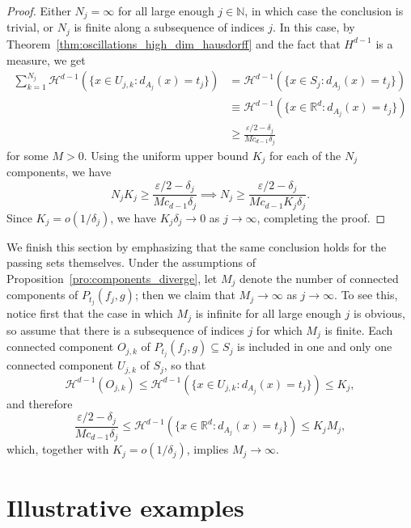 \documentclass[12pt]{article}
\newcommand{\RR}{\mathbb{R}}
\newcommand{\NN}{\mathbb{N}}
\begin{document}
\begin{proof}
Either $N_j=\infty$ for all large enough $j\in\NN$, in which case the conclusion is trivial, or
$N_j$ is finite along a subsequence of indices $j$. In this case, by
Theorem~\ref{thm:oscillations_high_dim_hausdorff} and the fact that $H^{d-1}$ is a measure, we get
\begin{align*}
\sum_{k=1}^{N_j} \mathcal{H}^{d-1}(\{x \in U_{j,k} : d_{A_j}(x) = t_j\}) & = \mathcal{H}^{d-1}(\{x \in S_j : d_{A_j}(x) = t_j\}) \\
& \equiv \mathcal{H}^{d-1}(\{x \in \RR^d : d_{A_j}(x) = t_j\}) \\
& \geq \frac{\varepsilon/2 - \delta_j}{M c_{d-1}\delta_j}
\end{align*}
%
for some $M>0$. Using the uniform upper bound $K_j$ for each of the $N_j$ components, we have
\begin{equation*}
N_j K_j \geq \frac{\varepsilon/2 - \delta_j}{M c_{d-1}\delta_j} \implies N_j \geq \frac{\varepsilon/2 - \delta_j}{M c_{d-1} K_j \delta_j}.
\end{equation*}
Since $K_j = o(1/\delta_j)$, we have $K_j \delta_j \to 0$ as $j \to \infty$, completing the proof.
\end{proof}

We finish this section by emphasizing that the same conclusion holds for the passing sets themselves. Under the assumptions of
Proposition~\ref{pro:components_diverge}, let $M_j$ denote the number of connected components of
$P_{t_j}(f_j,g)$; then we claim that $M_j \to \infty$ as $j \to \infty$. To see this, notice first that the case in which $M_j$
is infinite for all large enough $j$ is obvious, so assume that there is a subsequence of indices
$j$ for which $M_j$ is finite. Each connected component $O_{j,k}$ of
$P_{t_j}(f_j,g)\subseteq S_j$ is included in one and only one connected component
$U_{j,k}$ of $S_j$, so that
\begin{equation*}
\mathcal H^{d-1}(O_{j,k})\leq \mathcal{H}^{d-1}(\{x \in U_{j,k} : d_{A_j}(x) = t_j\}) \leq K_j,
\end{equation*}
and therefore
\begin{equation*}
\frac{\varepsilon/2-\delta_j}{Mc_{d-1}\delta_j}\leq\mathcal{H}^{d-1}(\{x \in \RR^d : d_{A_j}(x) = t_j\}) \leq K_jM_j,
\end{equation*}
which, together with $K_j=o(1/\delta_j)$, implies $M_j\to\infty$.

\section{Illustrative examples}\label{sec:example}
\end{document}

